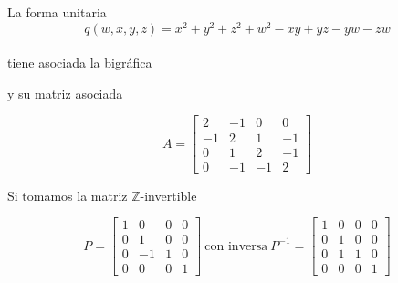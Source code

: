 \begin{example}\citep{AbarcaSoteloMarioAlberto2011Apds}
La forma unitaria
\begin{equation}
    q(w, x, y, z) = x^{2} + y^{2} + z^{2} + w^{2} - xy + yz - yw - zw
    \label{ecuacion:1.5}
\end{equation}\\

tiene asociada la bigráfica

\begin{center}
\end{center}

y su matriz asociada

\begin{center}
\begin{equation*}
    A = \begin{bmatrix}
    2 & -1  &  0 &  0\\
   -1 &  2  &  1 & -1\\
    0 &  1  &  2 & -1 \\
    0 & -1  & -1 &  2
    \end{bmatrix}
\end{equation*}
\end{center}

Si tomamos la matriz $\mathbb{Z}$-invertible

\begin{equation*}
P = \begin{bmatrix}
   1 &  0  & 0 & 0\\
   0 &  1  & 0 & 0\\
   0 & -1  & 1 & 0 \\
   0 &  0  & 0 & 1
      \end{bmatrix}~ \text{con inversa} ~ P^{-1} =  \begin{bmatrix}
   1 &  0  & 0 & 0\\
   0 &  1  & 0 & 0\\
   0 &  1  & 1 & 0 \\
   0 &  0  & 0 & 1
           \end{bmatrix}
\end{equation*}


\end{example}
